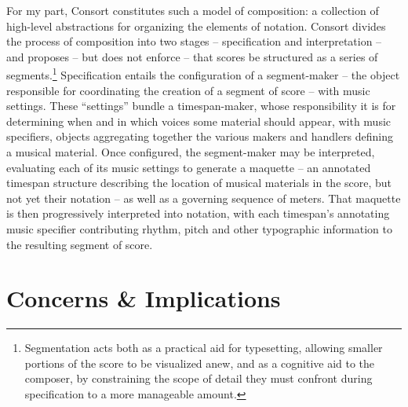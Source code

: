 For my part, Consort constitutes such a model of composition: a collection of
high-level abstractions for organizing the elements of notation. Consort
divides the process of composition into two stages -- specification and
interpretation -- and proposes -- but does not enforce -- that scores be
structured as a series of segments.\footnote{Segmentation acts both as a
practical aid for typesetting, allowing smaller portions of the score to be
visualized anew, and as a cognitive aid to the composer, by constraining the
scope of detail they must confront during specification to a more manageable
amount.} Specification entails the configuration of a segment-maker -- the
object responsible for coordinating the creation of a segment of score -- with
music settings. These \enquote{settings} bundle a timespan-maker, whose
responsibility it is for determining when and in which voices some material
should appear, with music specifiers, objects aggregating together the various
makers and handlers defining a musical material. Once configured, the
segment-maker may be interpreted, evaluating each of its music settings to
generate a maquette -- an annotated timespan structure describing the location
of musical materials in the score, but not yet their notation -- as well as a
governing sequence of meters. That maquette is then progressively interpreted
into notation, with each timespan's annotating music specifier contributing
rhythm, pitch and other typographic information to the resulting segment of
score.

\section{Concerns \& Implications}
\label{sec:concerns-and-implications}

